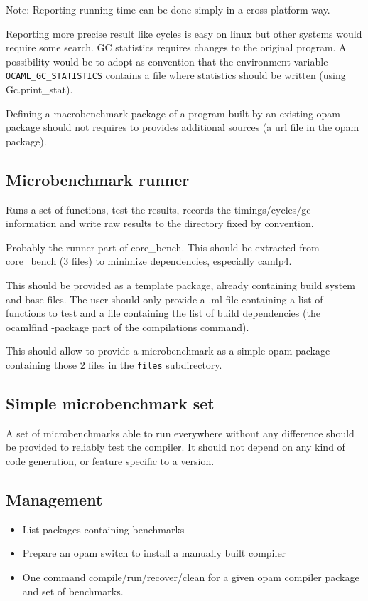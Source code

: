 \documentclass[11pt,a4paper]{article}
\begin{document}
Note: Reporting running time can be done simply in a cross platform
way.

Reporting more precise result like cycles is easy on linux but
other systems would require some search. GC statistics requires
changes to the original program. A possibility would be to adopt as
convention that the environment variable
\texttt{OCAML\_GC\_STATISTICS} contains a file where statistics should
be written (using Gc.print\_stat).

Defining a macrobenchmark package of a program built by an existing
opam package should not requires to provides additional sources (a
url file in the opam package).

\subsection{Microbenchmark runner}

Runs a set of functions, test the results, records the
timings/cycles/gc information and write raw results to the directory
fixed by convention.

Probably the runner part of core\_bench. This should be extracted from
core\_bench (3 files) to minimize dependencies, especially camlp4.

This should be provided as a template package, already containing
build system and base files. The user should only provide a .ml file
containing a list of functions to test and a file containing the list
of build dependencies (the ocamlfind -package part of the compilations
command).

This should allow to provide a microbenchmark as a simple opam package
containing those 2 files in the \texttt{files} subdirectory.

\subsection{Simple microbenchmark set}

A set of microbenchmarks able to run everywhere without any difference
should be provided to reliably test the compiler. It should not depend
on any kind of code generation, or feature specific to a version.

\subsection{Management}

\begin{itemize}
\item List packages containing benchmarks
\item Prepare an opam switch to install a manually built compiler
\item One command compile/run/recover/clean for a given opam compiler
  package and set of benchmarks.
\end{itemize}
\end{document}
